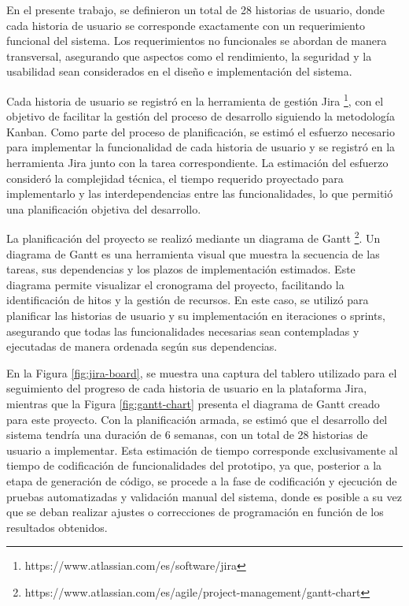 En el presente trabajo, se definieron un total de 28 historias de usuario, donde cada historia de usuario se corresponde exactamente con un requerimiento funcional del sistema. Los requerimientos no funcionales se abordan de manera transversal, asegurando que aspectos como el rendimiento, la seguridad y la usabilidad sean considerados en el diseño e implementación del sistema.

Cada historia de usuario se registró en la herramienta de gestión Jira \footnote{https://www.atlassian.com/es/software/jira}, con el objetivo de facilitar la gestión del proceso de desarrollo siguiendo la metodología Kanban. Como parte del proceso de planificación, se estimó el esfuerzo necesario para implementar la funcionalidad de cada historia de usuario y se registró en la herramienta Jira junto con la tarea correspondiente. La estimación del esfuerzo consideró la complejidad técnica, el tiempo requerido proyectado para implementarlo y las interdependencias entre las funcionalidades, lo que permitió una planificación objetiva del desarrollo.

La planificación del proyecto se realizó mediante un diagrama de Gantt \footnote{https://www.atlassian.com/es/agile/project-management/gantt-chart}. Un diagrama de Gantt es una herramienta visual que muestra la secuencia de las tareas, sus dependencias y los plazos de implementación estimados. Este diagrama permite visualizar el cronograma del proyecto, facilitando la identificación de hitos y la gestión de recursos. En este caso, se utilizó para planificar las historias de usuario y su implementación en iteraciones o sprints, asegurando que todas las funcionalidades necesarias sean contempladas y ejecutadas de manera ordenada según sus dependencias.

En la Figura \ref{fig:jira-board}, se muestra una captura del tablero utilizado para el seguimiento del progreso de cada historia de usuario en la plataforma Jira, mientras que la Figura \ref{fig:gantt-chart} presenta el diagrama de Gantt creado para este proyecto. Con la planificación armada, se estimó que el desarrollo del sistema tendría una duración de 6 semanas, con un total de 28 historias de usuario a implementar. Esta estimación de tiempo corresponde exclusivamente al tiempo de codificación de funcionalidades del prototipo, ya que, posterior a la etapa de generación de código, se procede a la fase de codificación y ejecución de pruebas automatizadas y validación manual del sistema, donde es posible a su vez que se deban realizar ajustes o correcciones de programación en función de los resultados obtenidos.

